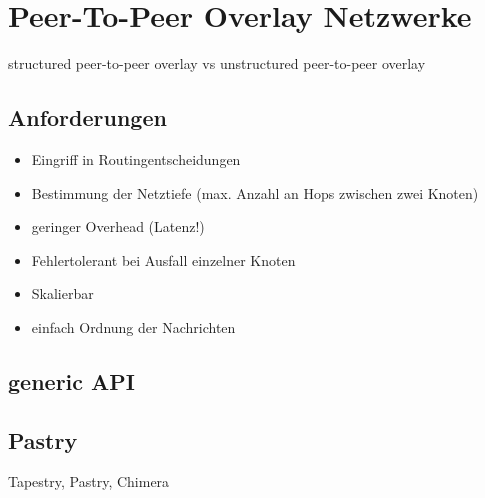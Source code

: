 \section{Peer-To-Peer Overlay Netzwerke}
\label{chap:grundlagen:overlay}
structured peer-to-peer overlay vs unstructured peer-to-peer overlay

\subsection{Anforderungen}
\begin{itemize}
\item Eingriff in Routingentscheidungen
\item Bestimmung der Netztiefe (max. Anzahl an Hops zwischen zwei Knoten)
\item geringer Overhead (Latenz!)
\item Fehlertolerant bei Ausfall einzelner Knoten
\item Skalierbar
\item einfach Ordnung der Nachrichten
\end{itemize}

\subsection{generic API}
\cite{citeulike:6643572} %

\subsection{Pastry}
\cite{citeulike:780210} %
Tapestry, Pastry, Chimera
